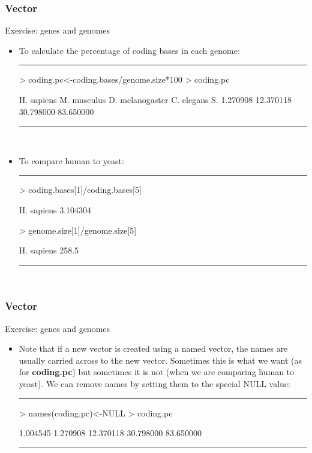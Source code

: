 \documentclass{beamer}
\begin{document}
\begin{frame}[fragile]
	\frametitle{Vector}
	\Large Exercise: genes and genomes
	\begin{itemize}
	\small
	  \item To calculate the percentage of coding bases in each genome:
\rule{\textwidth}{0.4pt}
\footnotesize
\begin{Schunk}
\begin{Sinput}
> coding.pc<-coding.bases/genome.size*100
> coding.pc
\end{Sinput}
\begin{Soutput}
     H. sapiens     M. musculus D. melanogaster      C. elegans  S.        1.270908       12.370118       30.798000       83.650000 
\end{Soutput}
\end{Schunk}
  \rule{\textwidth}{0.4pt}\\
  \small
  \pause
    \item To compare human to yeast:
\rule{\textwidth}{0.4pt}
\footnotesize
\begin{Schunk}
\begin{Sinput}
> coding.bases[1]/coding.bases[5]
\end{Sinput}
\begin{Soutput}
H. sapiens 
  3.104304 
\end{Soutput}
\begin{Sinput}
> genome.size[1]/genome.size[5]
\end{Sinput}
\begin{Soutput}
H. sapiens 
     258.5 
\end{Soutput}
\end{Schunk}
  \rule{\textwidth}{0.4pt}\\
	\end{itemize}
\end{frame}

\begin{frame}[fragile]
	\frametitle{Vector}
	\Large Exercise: genes and genomes
	\begin{itemize}
	\small
	  \item Note that if a new vector is created using a named vector, the names are usually carried across to the new vector. Sometimes this is what we want (as for \textbf{coding.pc}) but sometimes it is not (when we are comparing human to yeast). We can remove names by setting them to the special NULL value:
\rule{\textwidth}{0.4pt}
\footnotesize
\begin{Schunk}
\begin{Sinput}
> names(coding.pc)<-NULL
> coding.pc
\end{Sinput}
\begin{Soutput}
[1]  1.004545  1.270908 12.370118 30.798000 83.650000
\end{Soutput}
\end{Schunk}
  \rule{\textwidth}{0.4pt}\\
	\end{itemize}
\end{frame}
\end{document}

